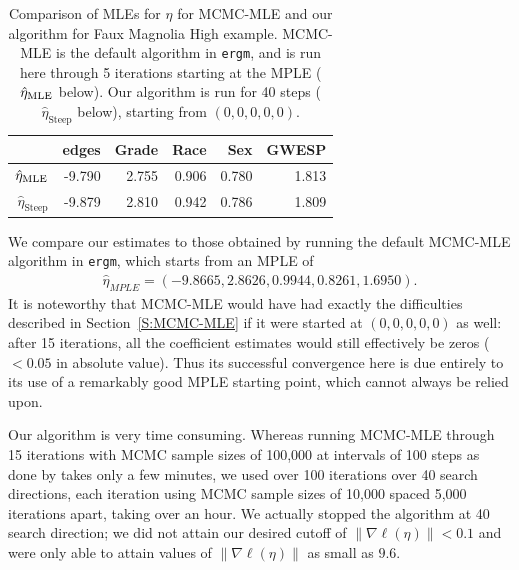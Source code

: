 \begin{table}[h!]  
\begin{center} 
\caption[Comparison of MLEs for $\eta$ for MCMC-MLE and our algorithm for Faux Magnolia High example]{Comparison of MLEs for $\eta$ for MCMC-MLE and our algorithm for Faux Magnolia High example.  MCMC-MLE is the default algorithm
in \texttt{ergm}, and is run here through 5 iterations starting
at the MPLE ($\hat{\eta}_{\textrm{MLE}}$ below).
Our algorithm is run for 40 steps ($\hat{\eta}_{\textrm{Steep}}$ below),
starting from $(0,0,0,0,0)$.\\
}
\begin{tabular}{rrrrrr}
  \hline
 & edges & Grade & Race & Sex & GWESP \\ 
  \hline
$\hat{\eta}_{\textrm{MLE}}$ & -9.790 & 2.755 & 0.906 & 0.780 & 1.813 \\ 
$\hat{\eta}_{\textrm{Steep}}$ & -9.879 & 2.810 & 0.942 & 0.786 & 1.809 \\ 
   \hline
\end{tabular}\label{T:FauxMagnolia}
\end{center}
\end{table}

We compare our estimates to those obtained by running the default MCMC-MLE algorithm 
in \texttt{ergm}, which starts from an MPLE of
\begin{align*}
	\hat{\eta}_{MPLE } = ( -9.8665, 2.8626, 0.9944, 0.8261, 1.6950 ).
\end{align*}
It is noteworthy that MCMC-MLE would have had exactly the difficulties 
described in Section~\ref{S:MCMC-MLE} if it were started at $(0, 0, 0, 0, 0)$ 
as well:
after 15 iterations, all the coefficient estimates would still effectively be zeros
($< 0.05$ in absolute value).
Thus its successful convergence here is due entirely to its use of 
a remarkably good MPLE starting point, which cannot always be relied upon.

Our algorithm is very time consuming.  Whereas running MCMC-MLE through 15 iterations with MCMC sample sizes of 100,000 at intervals of 100 steps as done 
by \citet{statnet-tutorial} takes only a few minutes, 
we used over 100 iterations over 40 search directions, 
each iteration using MCMC sample sizes of 
10,000 spaced 5,000 iterations apart, taking over an hour.  We actually stopped the 
algorithm at 40 search direction; we did not attain our desired cutoff of 
$\lVert \nabla \ell(\eta) \rVert < 0.1$ and were only able to 
attain values of $\lVert \nabla \ell(\eta) \rVert$ as small as $9.6$.
 
